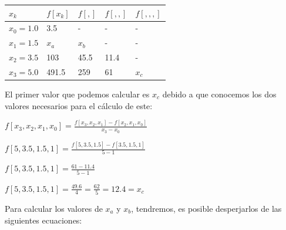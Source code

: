 \documentclass[english,notitlepage,letterpaper, 10pt]{article} %
\begin{document}
\begin{enumerate}
\begin{enumerate}
\begin{center}
      \begin{center}
        \begin{table}[H]

          \centering
          \begin{tabular}{|p{1.5cm}|p{1.5cm}|p{1.5cm}|p{1.5cm}|p{1.5cm}|}
    
           \hline  
           $x_k$ & $f[x_k]$ & $f[,]$ & $f[,,]$ & $f[,,,]$    \\ \hline
          $x_0 = 1.0$ & 3.5   & -      & -       & -         \\ \hline
          $x_1 = 1.5$ & $x_a$ & $x_b$  & -       & -         \\ \hline
          $x_2 = 3.5$ & 103   & 45.5   & 11.4    & -         \\ \hline
          $x_3 = 5.0$ & 491.5 & 259  & 61      & $x_c$     \\ \hline
    
          \end{tabular}
        \end{table}
      \end{center}

      \end{center}

      El primer valor que podemos calcular es $x_c$ debido a que conocemos los dos valores necesarios para el cálculo de este:

      \begin{center}
        \begin{math}
          f[x_3,x_2,x_1,x_0] = \displaystyle \frac{f[x_3,x_2,x_1] - f[x_2,x_1,x_0]}{x_3 - x_0}
        \end{math}

        \begin{math}
          f[5,3.5,1.5,1] = \displaystyle \frac{f[5,3.5,1.5] - f[3.5,1.5,1]}{5 - 1}
        \end{math}

        \begin{math}
          f[5,3.5,1.5,1] = \displaystyle \frac{61 - 11.4}{5 - 1}
        \end{math}

        \begin{math}
          f[5,3.5,1.5,1] = \displaystyle \frac{49.6}{4} = \frac{62}{5} = 12.4 = x_c
        \end{math}
      \end{center}

      Para calcular los valores de $x_a$ y $x_b$, tendremos, es posible desperjarlos de las siguientes ecuaciones:


\end{enumerate}
\end{enumerate}
\end{document}
